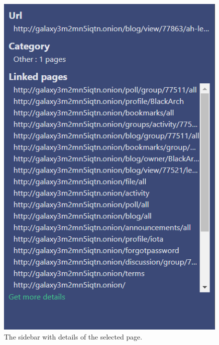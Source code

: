 \begin{figure}
\begin{minipage}[t]{0.475\textwidth}
    \includegraphics[width=\textwidth]{Images/page_sidebar.png}
    \caption{The sidebar with details of the selected page.}
    \label{sidebarPageDetails}
  \end{minipage} 
\end{figure}

